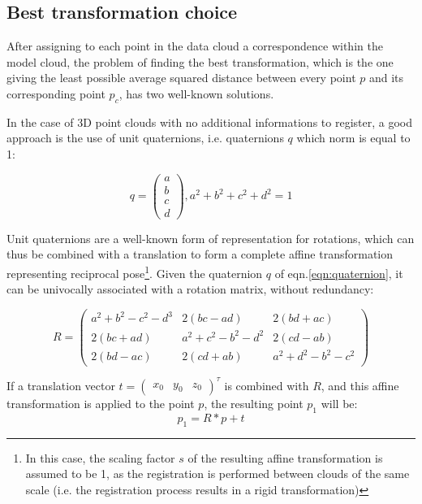 \subsection{Best transformation choice} \label{sec:icp-best-transformation}
After assigning to each point in the data cloud a correspondence within the
model cloud, the problem of finding the best transformation, which is the one
giving the least possible average squared distance between every point $p$ and
its corresponding point $p_c$, has two well-known solutions. 

In the case of 3D point clouds with no additional informations to register, a
good approach is the use of unit quaternions, i.e. quaternions $q$ which norm is
equal to 1:

\begin{equation} \label{eqn:quaternion}
q = \begin{pmatrix}a\\b\\c\\d\end{pmatrix}, a^2+b^2+c^2+d^2=1
\end{equation}

Unit quaternions are a well-known form of representation for rotations, which can
thus be combined with a translation to form a complete affine transformation
representing reciprocal pose\footnote{In this case, the scaling factor $s$ of
  the resulting affine transformation is assumed to be 1, as the registration is
  performed between clouds of the same scale (i.e. the registration process
results in a rigid transformation)}. Given the quaternion $q$ of
eqn.\ref{eqn:quaternion}, it can be univocally associated with a rotation
matrix, without redundancy:

\begin{equation} 
  R = \begin{pmatrix}
    a^2+b^2-c^2-d^3 & 2\left(b c - a d \right) & 2\left( b d + a c \right) \\
    2\left(b c + a d \right) & a^2+c^2-b^2-d^2 & 2\left( c d - a b \right) \\
    2\left( b d - a c \right) & 2\left(c d + a b\right) & a^2+d^2-b^2-c^2
  \end{pmatrix}
\end{equation}

If a translation vector $t=\begin{pmatrix}x_0 & y_0 & z_0\end{pmatrix}^{\tau}$
is combined with $R$, and this affine transformation is applied to the point
$p$, the resulting point $p_1$ will be:
\begin{equation}
  p_1=R*p+t
\end{equation}


